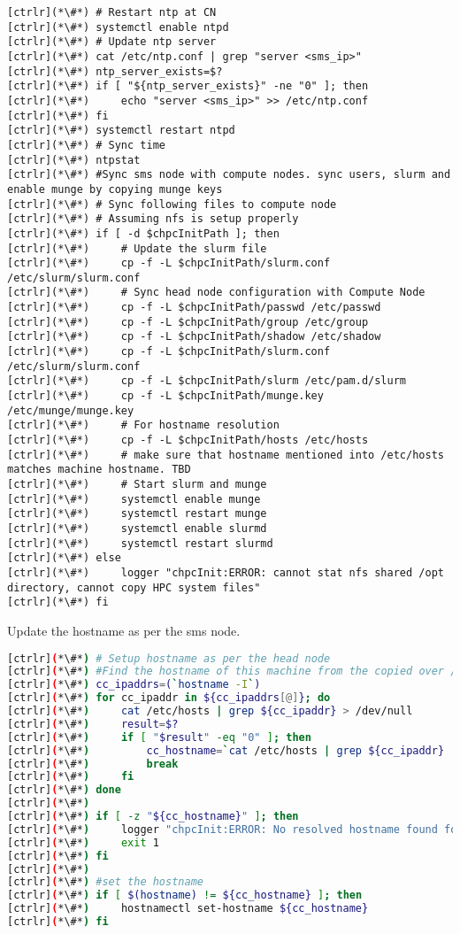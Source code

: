 \begin{lstlisting}
[ctrlr](*\#*) # Restart ntp at CN
[ctrlr](*\#*) systemctl enable ntpd
[ctrlr](*\#*) # Update ntp server
[ctrlr](*\#*) cat /etc/ntp.conf | grep "server <sms_ip>"
[ctrlr](*\#*) ntp_server_exists=$?
[ctrlr](*\#*) if [ "${ntp_server_exists}" -ne "0" ]; then
[ctrlr](*\#*)     echo "server <sms_ip>" >> /etc/ntp.conf
[ctrlr](*\#*) fi
[ctrlr](*\#*) systemctl restart ntpd
[ctrlr](*\#*) # Sync time
[ctrlr](*\#*) ntpstat
[ctrlr](*\#*) #Sync sms node with compute nodes. sync users, slurm and enable munge by copying munge keys
[ctrlr](*\#*) # Sync following files to compute node
[ctrlr](*\#*) # Assuming nfs is setup properly
[ctrlr](*\#*) if [ -d $chpcInitPath ]; then
[ctrlr](*\#*)     # Update the slurm file
[ctrlr](*\#*)     cp -f -L $chpcInitPath/slurm.conf /etc/slurm/slurm.conf
[ctrlr](*\#*)     # Sync head node configuration with Compute Node
[ctrlr](*\#*)     cp -f -L $chpcInitPath/passwd /etc/passwd
[ctrlr](*\#*)     cp -f -L $chpcInitPath/group /etc/group
[ctrlr](*\#*)     cp -f -L $chpcInitPath/shadow /etc/shadow
[ctrlr](*\#*)     cp -f -L $chpcInitPath/slurm.conf /etc/slurm/slurm.conf
[ctrlr](*\#*)     cp -f -L $chpcInitPath/slurm /etc/pam.d/slurm
[ctrlr](*\#*)     cp -f -L $chpcInitPath/munge.key /etc/munge/munge.key
[ctrlr](*\#*)     # For hostname resolution
[ctrlr](*\#*)     cp -f -L $chpcInitPath/hosts /etc/hosts
[ctrlr](*\#*)     # make sure that hostname mentioned into /etc/hosts matches machine hostname. TBD
[ctrlr](*\#*)     # Start slurm and munge 
[ctrlr](*\#*)     systemctl enable munge
[ctrlr](*\#*)     systemctl restart munge
[ctrlr](*\#*)     systemctl enable slurmd
[ctrlr](*\#*)     systemctl restart slurmd
[ctrlr](*\#*) else
[ctrlr](*\#*)     logger "chpcInit:ERROR: cannot stat nfs shared /opt directory, cannot copy HPC system files"
[ctrlr](*\#*) fi
\end{lstlisting}

	Update the hostname as per the sms node.


\begin{lstlisting}[language=bash,keywords={}]
[ctrlr](*\#*) # Setup hostname as per the head node
[ctrlr](*\#*) #Find the hostname of this machine from the copied over /etc/hosts file
[ctrlr](*\#*) cc_ipaddrs=(`hostname -I`)
[ctrlr](*\#*) for cc_ipaddr in ${cc_ipaddrs[@]}; do
[ctrlr](*\#*)     cat /etc/hosts | grep ${cc_ipaddr} > /dev/null
[ctrlr](*\#*)     result=$?
[ctrlr](*\#*)     if [ "$result" -eq "0" ]; then
[ctrlr](*\#*)         cc_hostname=`cat /etc/hosts | grep ${cc_ipaddr} | cut -d$'\t' -f2`
[ctrlr](*\#*)         break
[ctrlr](*\#*)     fi
[ctrlr](*\#*) done
[ctrlr](*\#*) 
[ctrlr](*\#*) if [ -z "${cc_hostname}" ]; then
[ctrlr](*\#*)     logger "chpcInit:ERROR: No resolved hostname found for any IP address in /etc/hosts"
[ctrlr](*\#*)     exit 1
[ctrlr](*\#*) fi
[ctrlr](*\#*) 
[ctrlr](*\#*) #set the hostname
[ctrlr](*\#*) if [ $(hostname) != ${cc_hostname} ]; then
[ctrlr](*\#*)     hostnamectl set-hostname ${cc_hostname}
[ctrlr](*\#*) fi
\end{lstlisting}

